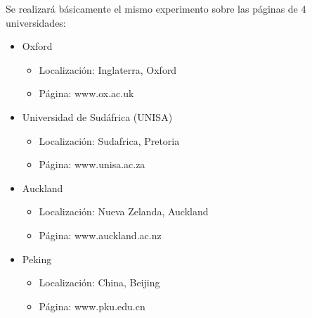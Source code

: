 \newpage


Se realizará básicamente el mismo experimento sobre las páginas de 4 universidades:

\begin{itemize}
	\item Oxford
	
	\begin{itemize}
		\item Localización: Inglaterra, Oxford 
		\item Página: www.ox.ac.uk
	\end{itemize}

	\item Universidad de Sudáfrica (UNISA)
	
	\begin{itemize}
		\item Localización: Sudafrica, Pretoria
		\item Página: www.unisa.ac.za
	\end{itemize}
		 
	\item Auckland
	 
	\begin{itemize}
		\item Localización: Nueva Zelanda, Auckland 
		\item Página: www.auckland.ac.nz
	\end{itemize}

	\item Peking
	 
	\begin{itemize}
		\item Localización: China, Beijing 
		\item Página: www.pku.edu.cn
	\end{itemize}

\end{itemize}


